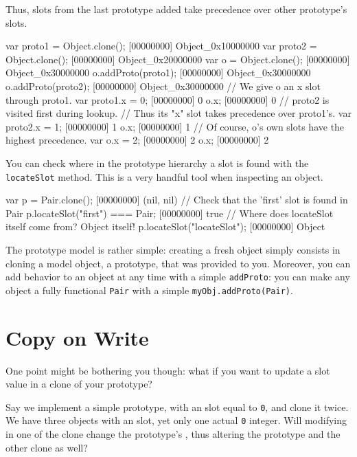 Thus, slots from the last prototype added take precedence over other
prototype's slots.

\begin{urbiscript}[firstnumber=1]
var proto1 = Object.clone();
[00000000] Object_0x10000000
var proto2 = Object.clone();
[00000000] Object_0x20000000
var o = Object.clone();
[00000000] Object_0x30000000
o.addProto(proto1);
[00000000] Object_0x30000000
o.addProto(proto2);
[00000000] Object_0x30000000
// We give o an x slot through proto1.
var proto1.x = 0;
[00000000] 0
o.x;
[00000000] 0
// proto2 is visited first during lookup.
// Thus its "x" slot takes precedence over proto1's.
var proto2.x = 1;
[00000000] 1
o.x;
[00000000] 1
// Of course, o's own slots have the highest precedence.
var o.x = 2;
[00000000] 2
o.x;
[00000000] 2
\end{urbiscript}

You can check where in the prototype hierarchy a slot is found with the
\lstinline{locateSlot} method. This is a very handful tool when inspecting
an object.

\begin{urbiscript}[firstnumber=1]
var p = Pair.clone();
[00000000] (nil, nil)
// Check that the 'first' slot is found in Pair
p.locateSlot("first") === Pair;
[00000000] true
// Where does locateSlot itself come from? Object itself!
p.locateSlot("locateSlot");
[00000000] Object
\end{urbiscript}

The prototype model is rather simple: creating a fresh object simply
consists in cloning a model object, a prototype, that was provided to you.
Moreover, you can add behavior to an object at any time with a simple
\lstinline{addProto}: you can make any object a fully functional
\lstinline|Pair| with a simple \lstinline|myObj.addProto(Pair)|.

\section{Copy on Write}

One point might be bothering you though: what if you want to update a slot
value in a clone of your prototype?

Say we implement a simple prototype, with an  slot equal to
\lstinline|0|, and clone it twice. We have three objects with an 
slot, yet only one actual \lstinline|0| integer. Will modifying  in
one of the clone change the prototype's , thus altering the prototype
and the other clone as well?


